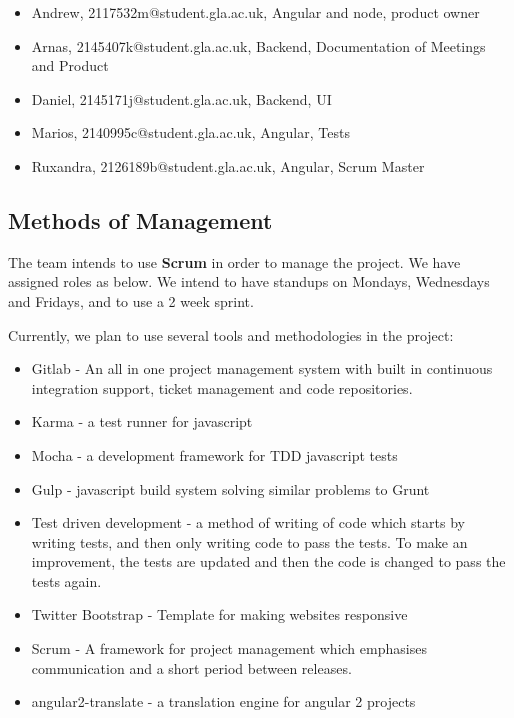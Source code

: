 \documentclass[10pt,a4paper]{article}
\begin{document}
\begin{itemize}

\item
Andrew, 2117532m@student.gla.ac.uk, Angular and node, product owner
\item
Arnas, 2145407k@student.gla.ac.uk, Backend, Documentation of Meetings and Product
\item
Daniel, 2145171j@student.gla.ac.uk, Backend, UI
\item
Marios, 2140995c@student.gla.ac.uk, Angular, Tests
\item
Ruxandra, 2126189b@student.gla.ac.uk, Angular, Scrum Master

\end{itemize}

\subsection{Methods of Management}
The team intends to use \textbf{Scrum} in order to manage the project. We have assigned roles as below. We intend to have standups on Mondays, Wednesdays and Fridays, and to use a 2 week sprint.



Currently, we plan to use several tools and methodologies in the project:
\begin{itemize}

\item
Gitlab - An all in one project management system with built in continuous integration support, ticket management and code repositories. 

\item 
Karma - a test runner for javascript

\item
Mocha - a development framework for TDD javascript tests

\item
Gulp - javascript build system solving similar problems to Grunt

\item
Test driven development - a method of writing of code which starts by writing tests, and then only writing code to pass the tests. To make an improvement, the tests are updated and then the code is changed to pass the tests again.

\item
Twitter Bootstrap - Template for making websites responsive

\item
Scrum - A framework for project management which emphasises communication and a short period between releases.


\item 
angular2-translate - a translation engine for angular 2 projects

\end{itemize}
\end{document}
